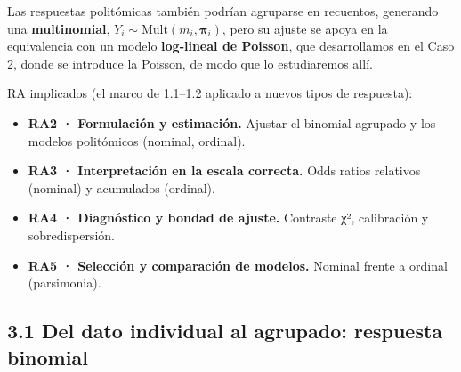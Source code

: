\documentclass[
  letterpaper,
  DIV=11,
  numbers=noendperiod]{scrartcl}
\providecommand{\tightlist}{%
  \setlength{\itemsep}{0pt}\setlength{\parskip}{0pt}}\usepackage{longtable,booktabs,array}
\begin{document}
\begin{tcolorbox}[enhanced jigsaw, breakable, colframe=quarto-callout-tip-color-frame, left=2mm, arc=.35mm, colbacktitle=quarto-callout-tip-color!10!white, toprule=.15mm, colback=white, coltitle=black, rightrule=.15mm, opacitybacktitle=0.6, title=\textcolor{quarto-callout-tip-color}{\faLightbulb}\hspace{0.5em}{Tip}, titlerule=0mm, toptitle=1mm, bottomtitle=1mm, leftrule=.75mm, bottomrule=.15mm, opacityback=0]

Las respuestas politómicas también podrían agruparse en recuentos,
generando una \textbf{multinomial},
\(Y_i\sim\mathrm{Mult}(m_i,\boldsymbol{\pi}_i)\), pero su ajuste se
apoya en la equivalencia con un modelo \textbf{log-lineal de Poisson},
que desarrollamos en el Caso 2, donde se introduce la Poisson, de modo
que lo estudiaremos allí.

\end{tcolorbox}

\begin{tcolorbox}[enhanced jigsaw, breakable, colframe=quarto-callout-note-color-frame, left=2mm, arc=.35mm, colbacktitle=quarto-callout-note-color!10!white, toprule=.15mm, colback=white, coltitle=black, rightrule=.15mm, opacitybacktitle=0.6, title=\textcolor{quarto-callout-note-color}{\faInfo}\hspace{0.5em}{Sobre esta unidad}, titlerule=0mm, toptitle=1mm, bottomtitle=1mm, leftrule=.75mm, bottomrule=.15mm, opacityback=0]

RA implicados (el marco de 1.1--1.2 aplicado a nuevos tipos de
respuesta):

\begin{itemize}
\tightlist
\item
  \textbf{RA2 · Formulación y estimación.} Ajustar el binomial agrupado
  y los modelos politómicos (nominal, ordinal).
\item
  \textbf{RA3 · Interpretación en la escala correcta.} Odds ratios
  relativos (nominal) y acumulados (ordinal).
\item
  \textbf{RA4 · Diagnóstico y bondad de ajuste.} Contraste χ²,
  calibración y sobredispersión.
\item
  \textbf{RA5 · Selección y comparación de modelos.} Nominal frente a
  ordinal (parsimonia).
\end{itemize}

\end{tcolorbox}

\hypertarget{sec-u13-binomial}{%
\subsection{3.1 Del dato individual al agrupado: respuesta
binomial}\label{sec-u13-binomial}}
\end{document}
